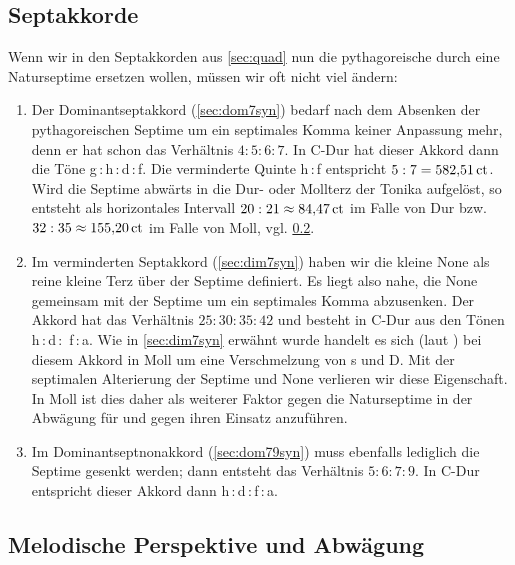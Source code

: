 \subsection{Septakkorde}

Wenn wir in den Septakkorden aus \cref{sec:quad} nun die pythagoreische durch
eine Naturseptime ersetzen wollen, müssen wir oft nicht viel ändern:

\begin{enumerate}
\item Der Dominantseptakkord (\cref{sec:dom7syn}) bedarf nach dem Absenken der
  pythagoreischen Septime um ein septimales Komma keiner Anpassung mehr, denn er
  hat schon das Verhältnis $4:5:6:7$. In C-Dur hat dieser Akkord dann die Töne
  g\,:\,\naturalm h\,:\,d\,:\,\septimal f.  Die verminderte Quinte \naturalm
  h\,:\,\septimal f entspricht $5:7 = 582{,}51\,\text{ct}$.  Wird die Septime abwärts in
  die Dur- oder Mollterz der Tonika aufgelöst, so entsteht als horizontales
  Intervall $20:21\approx 84{,}47\,\text{ct}$ im Falle von Dur bzw.
  $32:35\approx 155{,}20\,\text{ct}$ im Falle von Moll,
  vgl. \cref{sec:septmel}.
\item{} Im verminderten Septakkord
  (\cref{sec:dim7syn}) haben wir die kleine None als reine kleine Terz über der
  Septime definiert. Es liegt also nahe, die None gemeinsam mit der Septime um
  ein septimales Komma abzusenken. Der Akkord hat das Verhältnis $25:30:35:42$
  und besteht in C-Dur aus den Tönen \naturalm h\,:\,d\,:\,\septimal
  f\,:\,\septimal\flatp a. Wie in \cref{sec:dim7syn} erwähnt wurde handelt es
  sich (laut \cite[S.\,92ff.]{deLaMotte}) bei diesem Akkord in Moll um eine
  Verschmelzung von s und D. Mit der septimalen Alterierung der Septime und None
  verlieren wir diese Eigenschaft. In Moll ist dies daher als weiterer Faktor
  gegen die Naturseptime in der Abwägung für und gegen ihren Einsatz anzuführen.
\item Im Dominantseptnonakkord (\cref{sec:dom79syn}) muss ebenfalls lediglich
  die Septime gesenkt werden; dann entsteht das Verhältnis $5:6:7:9$. In C-Dur
  entspricht dieser Akkord dann \naturalm h\,:\,d\,:\,\septimal f\,:\,a.
\end{enumerate}

\subsection{Melodische Perspektive und Abwägung}
\label{sec:septmel}

